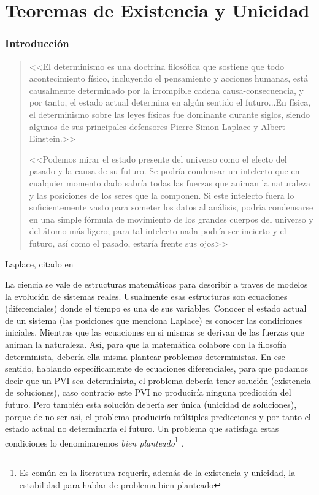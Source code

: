 \chapter{Teoremas de Existencia y Unicidad}



\subsection{Introducción}

\begin{quote}

 
 <<El determinismo es una doctrina filosófica que sostiene que todo acontecimiento físico, incluyendo el pensamiento y acciones humanas, está causalmente determinado por la irrompible cadena causa-consecuencia, y por tanto, el estado actual determina en algún sentido el futuro...En física, el determinismo sobre las leyes físicas fue dominante durante siglos, siendo algunos de sus principales defensores Pierre Simon Laplace y Albert Einstein.>>
 
<<Podemos mirar el estado presente del universo como el efecto del pasado y la causa de su futuro. Se podría condensar un intelecto que en cualquier momento dado sabría todas las fuerzas que animan la naturaleza y las posiciones de los seres que la componen. Si este intelecto fuera lo suficientemente vasto para someter los datos al análisis, podría condensarse en una simple fórmula de movimiento de los grandes cuerpos del universo y del átomo más ligero; para tal intelecto nada podría ser incierto y el futuro, así como el pasado, estaría frente sus ojos>>

\end{quote}
\begin{flushright}
Laplace, citado en \cite{ wiki:determinismo} \cite{Mazzo}
\end{flushright}


La ciencia se vale de estructuras matemáticas para describir a traves de modelos la evolución de sistemas reales. Usualmente esas estructuras son ecuaciones (diferenciales) donde el tiempo es una de sus variables. Conocer el estado actual de un sistema (las posiciones que menciona Laplace) es conocer las condiciones iniciales. Mientras que las ecuaciones en si mismas se derivan de  las fuerzas que animan la naturaleza.  Así, para que la matemática colabore con la filosofía determinista, debería ella misma plantear problemas deterministas.  En ese sentido, hablando específicamente de ecuaciones diferenciales, para que podamos decir que un PVI sea determinista, el problema debería tener solución (existencia de soluciones), caso contrario este PVI no produciría ninguna predicción del futuro. Pero también esta solución debería ser única (unicidad de soluciones), porque de no ser así, el problema produciría múltiples predicciones y por tanto el estado actual 
no determinaría el futuro. Un problema que satisfaga estas condiciones lo denominaremos \emph{bien planteado}\footnote{Es común en la literatura requerir, además de la existencia y unicidad, la estabilidad para hablar de problema bien planteado} . 

